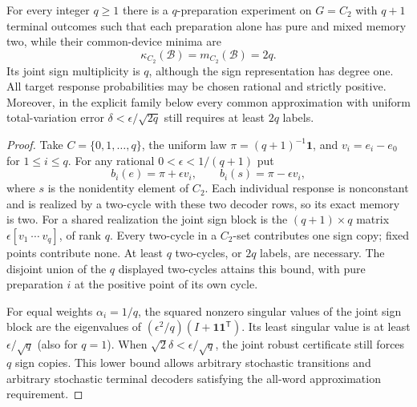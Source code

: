 \begin{proposition}
\label{prop:r77-shared-involution}
For every integer $q\ge1$ there is a $q$-preparation experiment on
$G=C_2$ with $q+1$ terminal outcomes such that each preparation alone
has pure and mixed memory two, while their common-device minima are
\[
 \kappa_{C_2}(\mathcal B)=m_{C_2}(\mathcal B)=2q.
\]
Its joint sign multiplicity is $q$, although the sign representation
has degree one.  All target response probabilities may be chosen rational and strictly
positive.  Moreover, in the explicit family below every common
approximation with uniform total-variation error
$\delta<\epsilon/\sqrt{2q}$ still requires at least $2q$ labels.
\end{proposition}
\begin{proof}
Take $C=\{0,1,\ldots,q\}$, the uniform law
$\pi=(q+1)^{-1}\mathbf1$, and $v_i=e_i-e_0$ for $1\le i\le q$.
For any rational $0<\epsilon<1/(q+1)$ put
\[
 b_i(e)=\pi+\epsilon v_i,\qquad
 b_i(s)=\pi-\epsilon v_i,
\]
where $s$ is the nonidentity element of $C_2$.  Each individual response
is nonconstant and is realized by a two-cycle with these two decoder
rows, so its exact memory is two.  For a shared realization the joint
sign block is the $(q+1)\times q$ matrix
$\epsilon[v_1\ \cdots\ v_q]$, of rank $q$.  Every two-cycle in a
$C_2$-set contributes one sign copy; fixed points contribute none.
At least $q$ two-cycles, or $2q$ labels, are necessary.  The disjoint
union of the $q$ displayed two-cycles attains this bound, with pure
preparation $i$ at the positive point of its own cycle.

For equal weights $\alpha_i=1/q$, the squared nonzero singular values
of the joint sign block are the eigenvalues of
$(\epsilon^2/q)(I+\mathbf1\mathbf1^{\mathsf T})$.
Its least singular value is at least $\epsilon/\sqrt q$ (also for
$q=1$).  When $\sqrt2\delta<\epsilon/\sqrt q$, the joint robust
certificate still forces $q$ sign copies.  This lower bound allows
arbitrary stochastic transitions and arbitrary stochastic terminal
decoders satisfying the all-word approximation requirement.
\end{proof}

